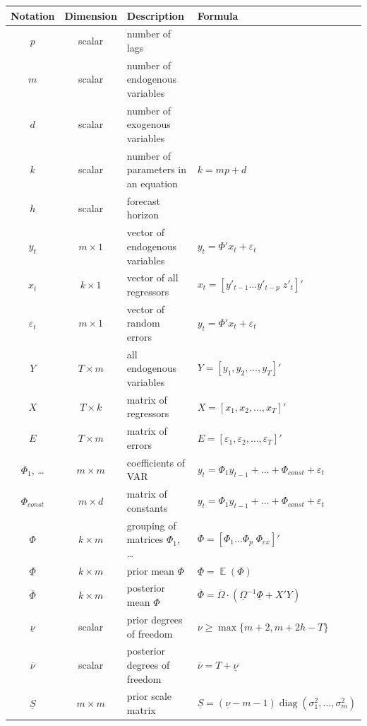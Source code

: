 \documentclass[11pt]{article} %
\DeclareMathOperator{\E}{\mathbb{E}}
\DeclareMathOperator{\diag}{diag}
\newcommand{\prior}{\underline}
\newcommand{\post}{\overline}
\begin{document}
\begin{center}
\begin{tabular}{ccp{6cm}l}
\toprule
Notation & Dimension &  Description & Formula \\
\midrule
$p$ & scalar & number of lags & \\
$m$ & scalar & number of endogenous variables & \\
$d$ & scalar & number of exogenous variables & \\
$k$ & scalar & number of parameters in an equation & $k=mp+d$ \\
$h$ & scalar & forecast horizon &  \\
\midrule
$y_t$ & $m \times 1$ &  vector of endogenous variables   & $y_t=\Phi' x_t+\varepsilon_t$ \\
$x_t$ & $k \times 1$ & vector of all regressors & $x_t=[ y'_{t-1} \ldots  y'_{t-p} \; z'_t ]'$ \\
$\varepsilon_t$ & $m \times 1$ & vector of random errors & $y_t=\Phi' x_t+\varepsilon_t$\\
$Y$ & $T \times m$ & all endogenous variables & $Y=[y_1, y_2,\ldots, y_T]'$ \\
$X$ & $T \times k$ & matrix of regressors& $X=[x_1, x_2,\ldots, x_T]'$ \\
$E$ & $T \times m$ & matrix of errors & $E=[\varepsilon_1, \varepsilon_2,\ldots, \varepsilon_T]'$ \\
\midrule
$\Phi_1$, \ldots & $m \times m$ & coefficients of VAR & $y_t= \Phi_1 y_{t-1} + \ldots + \Phi_{const} +\varepsilon_t$ \\
$\Phi_{const}$ & $m \times d$ & matrix of constants & $y_t= \Phi_1 y_{t-1} + \ldots + \Phi_{const} +\varepsilon_t$\\
$\Phi$ & $k \times m$ & grouping of matrices $\Phi_1$, \ldots & $\Phi=[ \Phi_1 \ldots \Phi_p \; \Phi_{ex}]'$ \\
\midrule %
$\prior \Phi$ & $k \times m$ & prior mean $\Phi$ & $\prior \Phi = \E (\Phi)$ \\
$\post \Phi$ & $k \times m$ & posterior mean $\Phi$ & $\post \Phi=\post{\Omega}\cdot (\prior \Omega^{-1}\prior \Phi+X'Y)$\\
$\prior \nu $ & scalar & prior degrees of freedom& $\nu\ge\max\lbrace m+2, m+2h-T\rbrace$ \\
$\post \nu $ & scalar & posterior degrees of freedom & $\post \nu = T + \prior \nu$ \\
$\prior S $ & $m \times m$& prior scale matrix& $\prior S= (\prior \nu- m- 1)\diag(\sigma^2_{1},\ldots,\sigma^2_{m})$\\

\end{tabular}
\end{center}
\end{document}
